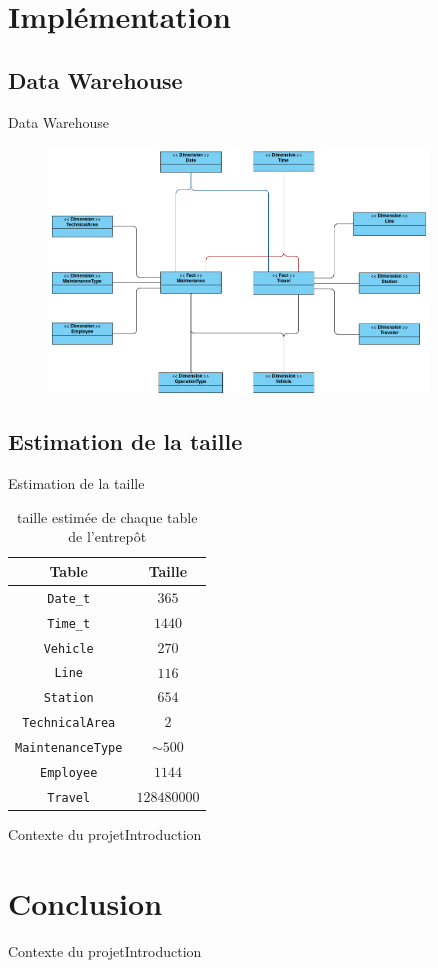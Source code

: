 \documentclass[usenames,dvipsnames]{beamer}
\begin{document}
\section{Implémentation}

\subsection{Data Warehouse}
\begin{frame}{Data Warehouse}
\begin{figure}[!ht]
  \centering
  \includegraphics[width=0.9\textwidth]{images/data_warehouse.png}
\end{figure}
\end{frame}

\subsection{Estimation de la taille}
\begin{frame}{Estimation de la taille}
\begin{table}[!ht]
  \centering
  \begin{tabular}{|c|c|}
    \hline
    \textbf{Table} & \textbf{Taille}\\
    \hline
    \texttt{Date\_t} & $365$\\
    \hline
    \texttt{Time\_t} & $1440$\\
    \hline
    \texttt{Vehicle} & $270$\\
    \hline
    \texttt{Line} & $116$\\
    \hline
    \texttt{Station} & $654$\\
    \hline
    \texttt{TechnicalArea} & $2$\\
    \hline
    \texttt{MaintenanceType} & $\sim500$\\
    \hline
    \texttt{Employee} & $1144$\\
    \hline
    \texttt{Travel} & $128480000$\\
    \hline
  \end{tabular}
  \caption{taille estimée de chaque table de l'entrepôt}
\end{table}
\end{frame}

\begin{frame}{Contexte du projet}{Introduction}
\end{frame}

\section{Conclusion}
\begin{frame}{Contexte du projet}{Introduction}
\end{frame}
\end{document}
